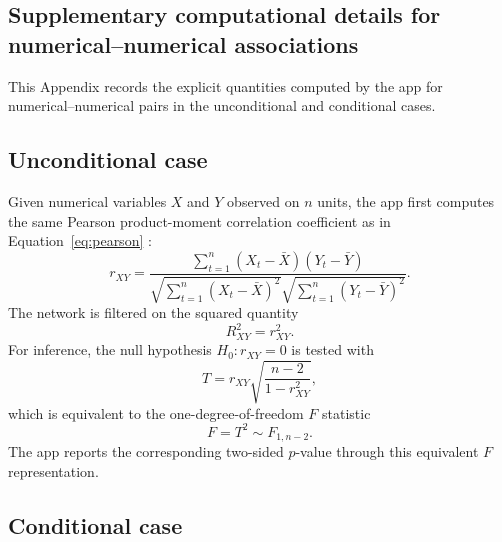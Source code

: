 \documentclass[11pt]{article}
\begin{document}
\begin{appendix}

\renewenvironment{equation}{\begin{equation*}}{\end{equation*}}
\renewenvironment{align}{\begin{align*}}{\end{align*}}

\section{Supplementary computational details for numerical--numerical associations}
\label{app:numnum}

This Appendix records the explicit quantities computed by the app for
numerical--numerical pairs in the unconditional and conditional cases.

\subsection{Unconditional case}

Given numerical variables $X$ and $Y$ observed on $n$ units, the app first
computes the same Pearson product-moment correlation coefficient as in
Equation~\eqref{eq:pearson} \citep{Pearson1896}:
\begin{equation}
r_{XY}
=
\frac{
\sum_{t=1}^{n}(X_t - \bar{X})(Y_t - \bar{Y})
}{
\sqrt{\sum_{t=1}^{n}(X_t - \bar{X})^2}
\sqrt{\sum_{t=1}^{n}(Y_t - \bar{Y})^2}
}.
\label{eq:app-pearson}
\end{equation}
The network is filtered on the squared quantity
\begin{equation}
R^2_{XY} = r_{XY}^2.
\label{eq:app-r2}
\end{equation}
For inference, the null hypothesis $H_0: r_{XY} = 0$ is tested with
\begin{equation}
T
=
r_{XY}\sqrt{\frac{n-2}{1-r_{XY}^2}},
\label{eq:app-t-pearson}
\end{equation}
which is equivalent to the one-degree-of-freedom $F$ statistic
\begin{equation}
F = T^2 \sim F_{1,n-2}.
\label{eq:app-f-pearson}
\end{equation}
The app reports the corresponding two-sided $p$-value through this equivalent
$F$ representation.

\subsection{Conditional case}


\end{appendix}
\end{document}
